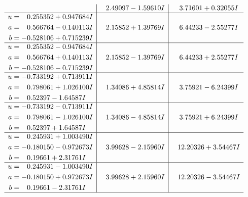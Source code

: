 \documentclass[1p]{elsarticle_modified}
\theoremstyle{definition}
\begin{document}
$$\begin{array}{c|c|c}
 & \phantom{-}2.49097 - 1.59610 I & \phantom{-}3.71601 + 0.32055 I \\ \hline\begin{aligned}
u &= \phantom{-}0.255352 + 0.947684 I \\
a &= \phantom{-}0.566764 - 0.140113 I \\
b &= -0.528106 + 0.715239 I\end{aligned}
 & \phantom{-}2.15852 + 1.39769 I & \phantom{-}6.44233 - 2.55277 I \\ \hline\begin{aligned}
u &= \phantom{-}0.255352 - 0.947684 I \\
a &= \phantom{-}0.566764 + 0.140113 I \\
b &= -0.528106 - 0.715239 I\end{aligned}
 & \phantom{-}2.15852 - 1.39769 I & \phantom{-}6.44233 + 2.55277 I \\ \hline\begin{aligned}
u &= -0.733192 + 0.713911 I \\
a &= \phantom{-}0.798061 + 1.026100 I \\
b &= \phantom{-}0.52397 - 1.64587 I\end{aligned}
 & \phantom{-}1.34086 + 4.85814 I & \phantom{-}3.75921 - 6.24399 I \\ \hline\begin{aligned}
u &= -0.733192 - 0.713911 I \\
a &= \phantom{-}0.798061 - 1.026100 I \\
b &= \phantom{-}0.52397 + 1.64587 I\end{aligned}
 & \phantom{-}1.34086 - 4.85814 I & \phantom{-}3.75921 + 6.24399 I \\ \hline\begin{aligned}
u &= \phantom{-}0.245931 + 1.003490 I \\
a &= -0.180150 - 0.972673 I \\
b &= \phantom{-}0.19661 + 2.31761 I\end{aligned}
 & \phantom{-}3.99628 - 2.15960 I & \phantom{-}12.20326 + 3.54467 I \\ \hline\begin{aligned}
u &= \phantom{-}0.245931 - 1.003490 I \\
a &= -0.180150 + 0.972673 I \\
b &= \phantom{-}0.19661 - 2.31761 I\end{aligned}
 & \phantom{-}3.99628 + 2.15960 I & \phantom{-}12.20326 - 3.54467 I\\
 \hline 

\end{array}$$
\end{document}
